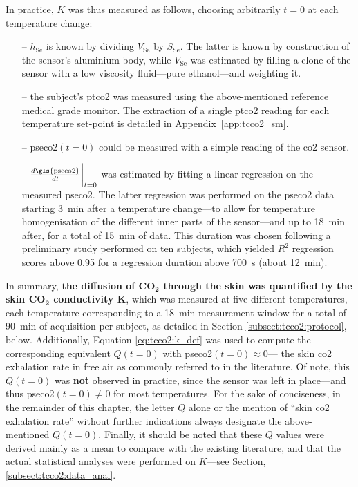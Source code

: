 In practice, $K$ was thus measured as follows, choosing arbitrarily $t=0$ at each temperature change:
\begin{itemize}
	\item[--] $h_\text{Se}$ is known by dividing $V_\text{Se}$ by $S_\text{Se}$. The latter is known by construction of the sensor's aluminium body, while $V_\text{Se}$ was estimated by filling a clone of the sensor with a low viscosity fluid---pure ethanol---and weighting it.
	\item[--] the subject's \gls{ptco2} was measured using the above-mentioned reference medical grade monitor. The extraction of a single \gls{ptco2} reading for each temperature set-point is detailed in Appendix~\ref{app:tcco2_sm}.
	\item[--] \gls{pseco2}$(t=0)$ could be measured with a simple reading of the \gls{co2} sensor.
	\item[--] $\frac{d\text{\gls{pseco2}}}{dt} \biggr\rvert_{t=0}$ was estimated by fitting a linear regression on the measured \gls{pseco2}. The latter regression was performed on the \gls{pseco2} data starting 3~min after a temperature change---to allow for temperature homogenisation of the different inner parts of the sensor---and up to 18~min after, for a total of 15~min of data. This duration was chosen following a preliminary study performed on ten subjects, which yielded $R^2$ regression scores above 0.95 for a regression duration above 700~s (about 12~min).
\end{itemize}

In summary, \textbf{the diffusion of $\mathbf{CO_2}$ through the skin was quantified by the skin $\mathbf{CO_2}$ conductivity $\boldsymbol{K}$}, which was measured at five different temperatures, each temperature corresponding to a 18~min measurement window for a total of 90~min of acquisition per subject, as detailed in Section \ref{subsect:tcco2:protocol}, below. Additionally, Equation \ref{eq:tcco2:k_def} was used to compute the corresponding equivalent $Q(t=0)$ with \gls{pseco2}$(t=0)\approx 0$---\ie{} the skin \gls{co2} exhalation rate in free air as commonly referred to in the literature. Of note, this $Q(t=0)$ was \textbf{not} observed in practice, since the sensor was left in place---and thus \gls{pseco2}$(t=0)\neq 0$ for most temperatures. For the sake of conciseness, in the remainder of this chapter, the letter $Q$ alone or the mention of \enquote{skin \gls{co2} exhalation rate} without further indications always designate the above-mentioned $Q(t=0)$. Finally, it should be noted that these $Q$ values were derived mainly as a mean to compare with the existing literature, and that the actual statistical analyses were performed on $K$---see Section, \ref{subsect:tcco2:data_anal}.

